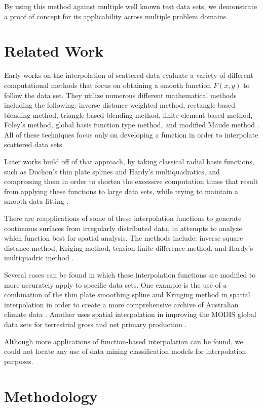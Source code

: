 \documentclass{sig-alternate}
\begin{document}
By using this method against multiple well known test data sets, we demonstrate a proof of concept for its applicability across multiple problem domains.

\section{Related Work}
Early works on the interpolation of scattered data evaluate a variety of different computational methods that focus on obtaining a smooth function $F(x, y)$ to follow the data set. They utilize numerous different mathematical methods including the following: inverse distance weighted method, rectangle based blending method, triangle based blending method, finite element based method, Foley's method, global basis function type method, and modified Maude method \cite{franke1982scattered}. All of these techniques focus only on developing a function in order to interpolate scattered data sets.

Later works build off of that approach, by taking classical radial basis functions, such as Duchon's thin plate splines and Hardy's multiquadratics, and compressing them in order to shorten the excessive computation times that result from applying these functions to large data sets, while trying to maintain a smooth data fitting \cite{floater1996multistep}.

There are reapplications of some of these interpolation functions to generate continuous surfaces from irregularly distributed data, in attempts to analyze which function best for spatial analysis. The methods include: inverse square distance method, Kriging method, tension finite difference method, and Hardy's multiquadric method \cite{caruso1998interpolation}. 

Several cases can be found in which these interpolation functions are modified to more accurately apply to specific data sets. One example is the use of a combination of the thin plate smoothing spline and Kringing method in spatial interpolation in order to create a more comprehensive archive of Australian climate data \cite{jeffrey2001using}. Another uses spatial interpolation in improving the MODIS global data sets for terrestrial gross and net primary production \cite{zhao2005improvements}.

Although more applications of function-based interpolation can be found, we could not locate any use of data mining classification models for interpolation purposes.

\section{Methodology}
\end{document}
